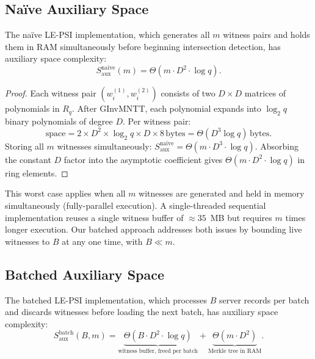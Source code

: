 \subsection{Naïve Auxiliary Space}

\begin{theorem}\label{thm:naive-space}
The na\"{i}ve LE-PSI implementation, which generates all $m$ witness pairs and
holds them in RAM simultaneously before beginning intersection detection, has
auxiliary space complexity:
\[
S_{\text{aux}}^{\text{naive}}(m) = \Theta\!\left(m \cdot D^2 \cdot \log q\right).
\]
\end{theorem}

\begin{proof}
Each witness pair $(w^{(1)}_i, w^{(2)}_i)$ consists of two $D \times D$ matrices
of polynomials in $R_q$. After GInvMNTT, each polynomial expands into $\log_2 q$
binary polynomials of degree $D$. Per witness pair:
\[
\text{space} = 2 \times D^2 \times \log_2 q \times D \times 8\,\text{bytes}
             = \Theta(D^3 \log q)\,\text{bytes}.
\]
Storing all $m$ witnesses simultaneously:
$S_{\text{aux}}^{\text{naive}} = \Theta(m \cdot D^3 \cdot \log q)$.
Absorbing the constant $D$ factor into the asymptotic coefficient gives
$\Theta(m \cdot D^2 \cdot \log q)$ in ring elements.
\end{proof}

\begin{remark}\label{rem:naive-worst-case}
This worst case applies when all $m$ witnesses are generated and held in memory
simultaneously (fully-parallel execution). A single-threaded sequential implementation
reuses a single witness buffer of $\approx 35$~MB but requires $m$ times longer execution.
Our batched approach addresses both issues by bounding live witnesses to $B$ at any one
time, with $B \ll m$.
\end{remark}

\subsection{Batched Auxiliary Space}

\begin{theorem}\label{thm:batch-space}
The batched LE-PSI implementation, which processes $B$ server records per
batch and discards witnesses before loading the next batch, has auxiliary
space complexity:
\[
S_{\text{aux}}^{\text{batch}}(B,m) =
  \underbrace{\Theta\!\left(B \cdot D^2 \cdot \log q\right)}_{\text{witness buffer, freed per batch}}
+ \underbrace{\Theta\!\left(m \cdot D^2\right)}_{\text{Merkle tree in RAM}}.
\]
\end{theorem}

